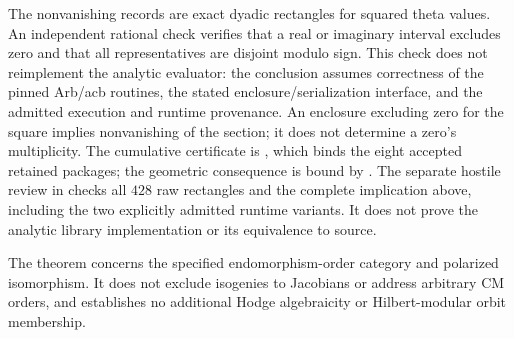 The nonvanishing records are exact dyadic rectangles for squared theta
values. An independent rational check verifies that a real or imaginary
interval excludes zero and that all representatives are disjoint modulo
sign. This check does not reimplement the analytic evaluator: the
conclusion assumes correctness of the pinned Arb/acb routines, the
stated enclosure/serialization interface, and the admitted execution
and runtime provenance. An enclosure excluding zero for the square
implies nonvanishing of the section; it does not determine a zero's
multiplicity. The cumulative certificate is
,
which binds the eight accepted retained packages; the geometric consequence
is bound by .
The separate hostile review in
checks all $428$ raw rectangles and the complete implication above, including
the two explicitly admitted runtime variants. It does not prove the analytic
library implementation or its equivalence to source.

The theorem concerns the specified endomorphism-order category and
polarized isomorphism. It does not exclude isogenies to Jacobians or
address arbitrary CM orders, and establishes no additional Hodge
algebraicity or Hilbert-modular orbit membership.

